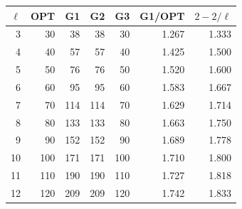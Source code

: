 \small\begin{tabular}{@{}rrrrrrr@{}}\toprule
\(\ell\) & OPT & G1 & G2 & G3 & G1/OPT & \(2-2/\ell\)\\\midrule
3 & 30 & 38 & 38 & 30 & 1.267 & 1.333\\
4 & 40 & 57 & 57 & 40 & 1.425 & 1.500\\
5 & 50 & 76 & 76 & 50 & 1.520 & 1.600\\
6 & 60 & 95 & 95 & 60 & 1.583 & 1.667\\
7 & 70 & 114 & 114 & 70 & 1.629 & 1.714\\
8 & 80 & 133 & 133 & 80 & 1.663 & 1.750\\
9 & 90 & 152 & 152 & 90 & 1.689 & 1.778\\
10 & 100 & 171 & 171 & 100 & 1.710 & 1.800\\
11 & 110 & 190 & 190 & 110 & 1.727 & 1.818\\
12 & 120 & 209 & 209 & 120 & 1.742 & 1.833\\
\bottomrule\end{tabular}
\label{tab:star}
